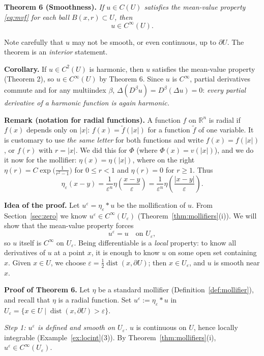 \documentclass[11pt]{article}
\theoremstyle{plain}
\theoremstyle{definition}
\theoremstyle{remark}
\begin{document}
\textbf{Theorem 6 (Smoothness).} \textit{If $u \in C(U)$ satisfies the mean-value property \eqref{eq:mvf} for each ball $B(x,r) \subset U$, then}
$$ u \in C^\infty(U). $$

Note carefully that $u$ may not be smooth, or even continuous, up to $\partial U$. The theorem is an \emph{interior} statement.

\textbf{Corollary.} If $u \in C^2(U)$ is harmonic, then $u$ satisfies the mean-value property (Theorem 2), so $u \in C^\infty(U)$ by Theorem 6. Since $u$ is $C^\infty$, partial derivatives commute and for any multiindex $\beta$, $\Delta(D^\beta u) = D^\beta(\Delta u) = 0$: \emph{every partial derivative of a harmonic function is again harmonic.}

\textbf{Remark (notation for radial functions).} A function $f$ on $\mathbb{R}^n$ is radial if $f(x)$ depends only on $|x|$: $f(x) = \tilde f(|x|)$ for a function $\tilde f$ of one variable. It is customary to use \emph{the same letter} for both functions and write $f(x) = f(|x|)$, or $f(r)$ with $r = |x|$. We did this for $\Phi$ (where $\Phi(x) = v(|x|)$), and we do it now for the mollifier: $\eta(x) = \eta(|x|)$, where on the right $\eta(r) = C\exp\big(\frac{1}{r^2-1}\big)$ for $0 \le r < 1$ and $\eta(r) = 0$ for $r \geq 1$. Thus
$$ \eta_\varepsilon(x - y) = \frac{1}{\varepsilon^n}\eta\left(\frac{x-y}{\varepsilon}\right) = \frac{1}{\varepsilon^n}\eta\left(\frac{|x-y|}{\varepsilon}\right). $$

\textbf{Idea of the proof.} Let $u^\varepsilon = \eta_\varepsilon * u$ be the mollification of $u$. From Section~\ref{sec:zero} we know $u^\varepsilon \in C^\infty(U_\varepsilon)$ (Theorem~\ref{thm:mollifiers}(i)). We will show that the mean-value property forces
$$ u^\varepsilon = u \quad \text{on } U_\varepsilon, $$
so $u$ itself is $C^\infty$ on $U_\varepsilon$. Being differentiable is a \emph{local} property: to know all derivatives of $u$ at a point $x$, it is enough to know $u$ on some open set containing $x$. Given $x \in U$, we choose $\varepsilon = \frac12\operatorname{dist}(x,\partial U)$; then $x \in U_\varepsilon$, and $u$ is smooth near $x$.

\textbf{Proof of Theorem 6.} Let $\eta$ be a standard mollifier (Definition~\ref{def:mollifier}), and recall that $\eta$ is a radial function. Set $u^\varepsilon := \eta_\varepsilon * u$ in $U_\varepsilon = \{x \in U \mid \operatorname{dist}(x,\partial U) > \varepsilon\}$.

\emph{Step 1: $u^\varepsilon$ is defined and smooth on $U_\varepsilon$.} $u$ is continuous on $U$, hence locally integrable (Example~\ref{ex:locint}(3)). By Theorem~\ref{thm:mollifiers}(i), $u^\varepsilon \in C^\infty(U_\varepsilon)$.
\end{document}
